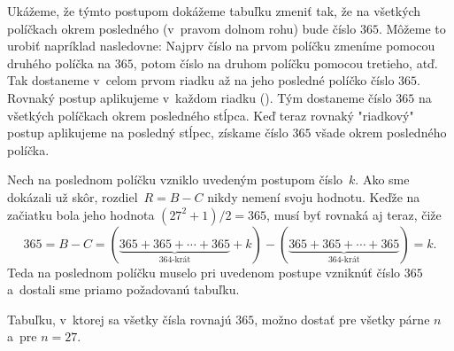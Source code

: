 {Ukážeme, že týmto postupom dokážeme tabuľku zmeniť tak, že na všetkých políčkach okrem posledného (v~pravom dolnom rohu) bude číslo $365$. Môžeme to urobiť napríklad nasledovne: Najprv číslo na prvom políčku zmeníme pomocou druhého políčka na $365$, potom číslo na druhom políčku pomocou tretieho, atď. Tak dostaneme v~celom prvom riadku až na jeho posledné políčko číslo $365$. Rovnaký postup aplikujeme v~každom riadku (\obr).
%
Tým dostaneme číslo $365$ na všetkých políčkach okrem posledného stĺpca. Keď teraz rovnaký "riadkový" postup aplikujeme na posledný stĺpec, získame číslo $365$ všade okrem posledného políčka.

Nech na poslednom políčku vzniklo uvedeným postupom číslo~$k$. Ako sme dokázali už skôr, rozdiel~$R=B-C$ nikdy nemení svoju hodnotu. Keďže na začiatku bola jeho hodnota $(27^2+1)/2=365$, musí byť rovnaká aj teraz, čiže
$$
365=B-C=(\underbrace{365+365+\cdots+365}_{\text{364-krát}}+k)-(\underbrace{365+365+\cdots+365}_{\text{364-krát}})=k.
$$
Teda na poslednom políčku muselo pri uvedenom postupe vzniknúť číslo $365$ a~dostali sme priamo požadovanú tabuľku.

\zaver
Tabuľku, v~ktorej sa všetky čísla rovnajú $365$, možno dostať pre všetky párne $n$ a~pre $n=27$.
}

